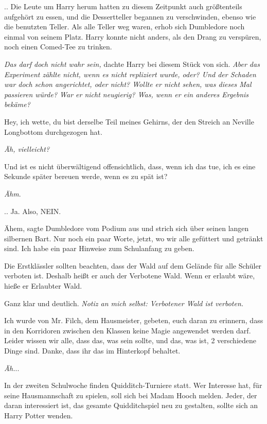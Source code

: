 .. Die Leute um Harry herum hatten zu diesem Zeitpunkt auch größtenteils
aufgehört zu essen, und die Dessertteller begannen zu verschwinden, ebenso wie
die benutzten Teller. Als alle Teller weg waren, erhob sich Dumbledore noch
einmal von seinem Platz. Harry konnte nicht anders, als den Drang zu verspüren,
noch einen Comed-Tee zu trinken.

\emph{Das darf doch nicht wahr sein,} dachte Harry bei diesem Stück von sich.
\emph{Aber das Experiment zählte nicht, wenn es nicht repliziert wurde, oder?
Und der Schaden war doch schon angerichtet, oder nicht? Wollte er nicht sehen,
was dieses Mal passieren würde? War er nicht neugierig? Was, wenn er ein anderes
Ergebnis bekäme?}

Hey, ich wette, du bist derselbe Teil meines Gehirns, der den Streich an Neville
Longbottom durchgezogen hat.

\emph{Äh, vielleicht?}

Und ist es nicht überwältigend offensichtlich, dass, wenn ich das tue, ich es
eine Sekunde später bereuen werde, wenn es zu spät ist?

\emph{Ähm}.

.. Ja. Also, NEIN.

\glqq{}Ähem\grqq{}, sagte Dumbledore vom Podium aus und strich sich über seinen
langen silbernen Bart. \glqq Nur noch ein paar Worte, jetzt, wo wir alle
gefüttert und getränkt sind. Ich habe ein paar Hinweise zum Schulanfang zu
geben.\grqq{}

\glqq Die Erstklässler sollten beachten, dass der Wald auf dem Gelände für alle
Schüler verboten ist. Deshalb heißt er auch der Verbotene Wald. Wenn er erlaubt
wäre, hieße er Erlaubter Wald.\grqq{}

Ganz klar und deutlich.
\emph{Notiz an mich selbst: Verbotener Wald ist verboten.}

\glqq Ich wurde von Mr. Filch, dem Hausmeister, gebeten, euch daran zu erinnern,
dass in den Korridoren zwischen den Klassen keine Magie angewendet werden darf.
Leider wissen wir alle, dass das, was sein sollte, und das, was ist, 2
verschiedene Dinge sind. Danke, dass ihr das im Hinterkopf behaltet.\grqq{}

\emph{Äh.}..

\glqq In der zweiten Schulwoche finden Quidditch-Turniere statt. Wer Interesse
hat, für seine Hausmannschaft zu spielen, soll sich bei Madam Hooch melden.
Jeder, der daran interessiert ist, das gesamte Quidditchspiel neu zu gestalten,
sollte sich an Harry Potter wenden.\grqq{}

